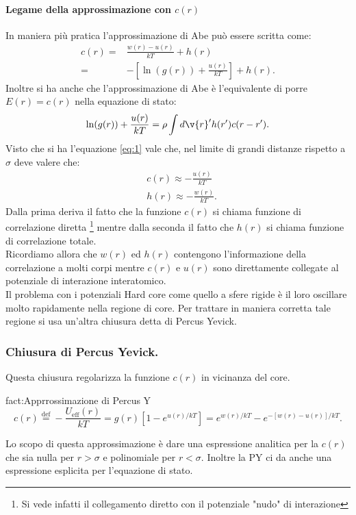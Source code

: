 \paragraph{Legame della approssimazione con $c(r)$}
In maniera più pratica l'approssimazione di Abe può essere scritta come:
 \[\begin{aligned}
	 c(r) 
	 =&
	 \frac{w(r)-u(r)}{kT}+h(r)\\
	 =&
	 - \left[ \ln(g(r)) + \frac{u(r)}{kT} \right] + h(r)
	 \label{eq:1}
.\end{aligned}\]
Inoltre si ha anche che l'approssimazione di Abe è l'equivalente di porre $E(r)=c(r)$ nella equazione di stato:
\[
	\ln(g(r)) + \frac{u(r)}{kT} = \rho \int d\v{r}' h(r')c(r-r')
	\label{eq:2}
.\] 
Visto che si ha l'equazione \ref{eq:1} vale che, nel limite di grandi distanze rispetto a  $\sigma$ deve valere che:
\[\begin{aligned}
	&c(r) \approx -\frac{u(r)}{kT}\\
	&h(r) \approx -\frac{w(r)}{kT}
.\end{aligned}\]
Dalla prima deriva il fatto che la funzione $c(r)$ si chiama funzione di correlazione diretta \footnote{Si vede infatti il collegamento diretto con il potenziale "nudo" di interazione} mentre dalla seconda il fatto che $h(r)$ si chiama funzione di correlazione totale.\\
Ricordiamo allora che $w(r)$ ed $h(r)$ contengono l'informazione della correlazione a molti corpi mentre $c(r)$ e $u(r)$ sono direttamente collegate al potenziale di interazione interatomico.\\
Il problema con i potenziali Hard core come quello a sfere rigide è il loro oscillare molto rapidamente nella regione di core.
Per trattare in maniera corretta tale regione si usa un'altra chiusura detta di Percus Yevick.
\subsubsection{Chiusura di Percus Yevick.}
\label{subsubsec:Chiusura di Percus Yevick.}
Questa chiusura regolarizza la funzione $c(r)$ in vicinanza del core.
\begin{fact}{fact:Apprrossimazione di Percus Y}
	\[
		c(r) 
		\stackrel{\text{def}}{=} 
		-\frac{U_\text{eff}(r)}{kT}
		=
		g(r)\left[ 1-e^{u(r)/kT} \right] 
		=
		e^{w(r)/kT}-e^{-\left[ w(r)-u(r) \right]/kT}
	.\] 
\end{fact}
Lo scopo di questa approssimazione è dare una espressione analitica per la $c(r)$ che sia nulla per $r>\sigma$ e polinomiale per $r<\sigma$. Inoltre la PY ci da anche una espressione esplicita per l'equazione di stato.
